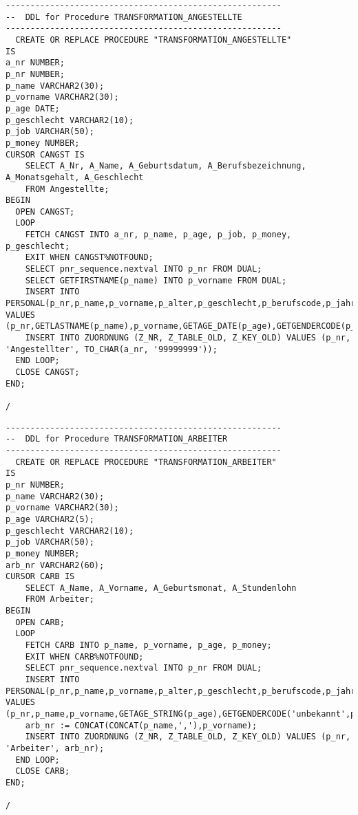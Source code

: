 \documentclass{scrartcl}
\begin{document}
\begin{lstlisting}
--------------------------------------------------------
--  DDL for Procedure TRANSFORMATION_ANGESTELLTE
--------------------------------------------------------
  CREATE OR REPLACE PROCEDURE "TRANSFORMATION_ANGESTELLTE" 
IS
a_nr NUMBER;
p_nr NUMBER;
p_name VARCHAR2(30);
p_vorname VARCHAR2(30);
p_age DATE;
p_geschlecht VARCHAR2(10);
p_job VARCHAR(50);
p_money NUMBER;
CURSOR CANGST IS
	SELECT A_Nr, A_Name, A_Geburtsdatum, A_Berufsbezeichnung, A_Monatsgehalt, A_Geschlecht
	FROM Angestellte;
BEGIN
  OPEN CANGST;
  LOOP 
	FETCH CANGST INTO a_nr, p_name, p_age, p_job, p_money, p_geschlecht;
	EXIT WHEN CANGST%NOTFOUND;
	SELECT pnr_sequence.nextval INTO p_nr FROM DUAL;
  	SELECT GETFIRSTNAME(p_name) INTO p_vorname FROM DUAL;
  	INSERT INTO PERSONAL(p_nr,p_name,p_vorname,p_alter,p_geschlecht,p_berufscode,p_jahreseinkommen) VALUES (p_nr,GETLASTNAME(p_name),p_vorname,GETAGE_DATE(p_age),GETGENDERCODE(p_geschlecht,p_vorname),GETJOBCODE(p_job),GETMONEY(p_money));
	INSERT INTO ZUORDNUNG (Z_NR, Z_TABLE_OLD, Z_KEY_OLD) VALUES (p_nr, 'Angestellter', TO_CHAR(a_nr, '99999999'));
  END LOOP; 
  CLOSE CANGST;
END;

/
\end{lstlisting}

\begin{lstlisting}
--------------------------------------------------------
--  DDL for Procedure TRANSFORMATION_ARBEITER
--------------------------------------------------------
  CREATE OR REPLACE PROCEDURE "TRANSFORMATION_ARBEITER" 
IS
p_nr NUMBER;
p_name VARCHAR2(30);
p_vorname VARCHAR2(30);
p_age VARCHAR2(5);
p_geschlecht VARCHAR2(10);
p_job VARCHAR(50);
p_money NUMBER;
arb_nr VARCHAR2(60);
CURSOR CARB IS
	SELECT A_Name, A_Vorname, A_Geburtsmonat, A_Stundenlohn
	FROM Arbeiter;
BEGIN
  OPEN CARB;
  LOOP 
	FETCH CARB INTO p_name, p_vorname, p_age, p_money;
	EXIT WHEN CARB%NOTFOUND;
	SELECT pnr_sequence.nextval INTO p_nr FROM DUAL;
 	INSERT INTO PERSONAL(p_nr,p_name,p_vorname,p_alter,p_geschlecht,p_berufscode,p_jahreseinkommen) VALUES (p_nr,p_name,p_vorname,GETAGE_STRING(p_age),GETGENDERCODE('unbekannt',p_vorname),GETJOBCODE('Arbeiter'),GETMONEY(p_money*4*40));
	arb_nr := CONCAT(CONCAT(p_name,','),p_vorname);
	INSERT INTO ZUORDNUNG (Z_NR, Z_TABLE_OLD, Z_KEY_OLD) VALUES (p_nr, 'Arbeiter', arb_nr);
  END LOOP; 
  CLOSE CARB;
END;

/
\end{lstlisting}
\end{document}
